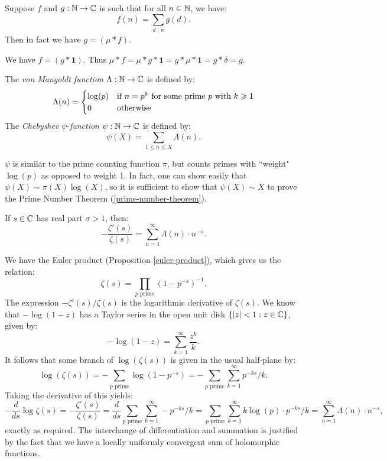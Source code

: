 \documentclass{article}
\begin{document}
\begin{theorem}
    Suppose $f$ and $g : \mathbb{N} \to \mathbb{C}$ is such that for all $n \in \mathbb{N}$, we have:
    \[
	f(n) = \sum_{d \mid n} g(d).
	\]
	Then in fact we have $g = (\mu * f)$.
\end{theorem}

\begin{prf}
    We have $f = (g * \mathbf{1})$. Thus $\mu * f = \mu * g * \mathbf{1} = g * \mu * \mathbf{1} = g * \delta = g$.
\end{prf}

\begin{definition}
    The \textit{von Mangoldt function} $\Lambda: \mathbb{N} \to \mathbb{C}$ is defined by:
    \[
	\Lambda(n) = \begin{cases}
		\log(p) & \text{if $n = p^k$ for some prime $p$ with $k \geqslant 1$} \\
		0 & \!\mathrel{\, \text{otherwise}}
	\end{cases}
	\]
	The \textit{Chebyshev} $\psi$-\textit{function} $\psi : \mathbb{N} \to \mathbb{C}$ is defined by:
	\[
	\psi(X) = \sum_{1 \leq n \leq X} \Lambda(n).
	\]
\end{definition}

\begin{note}
	$\psi$ is similar to the prime counting function $\pi$, but counts primes with ``weight" $\log(p)$ as opposed to weight 1. In fact, one can show easily that $\psi(X) \sim \pi(X) \log(X)$, so it is sufficient to show that $\psi(X) \sim X$ to prove the Prime Number Theorem (\ref{prime-number-theorem}).
\end{note}

\begin{theorem}
    If $s \in \mathbb{C}$ has real part $\sigma > 1$, then:
    \[
	- \frac{\zeta'(s)}{\zeta(s)} = \sum_{n=1}^\infty \Lambda(n) \cdot n^{-s}.
	\]
\end{theorem}

\begin{prf}
    We have the Euler product (Proposition \ref{euler-product}), which gives us the relation:
    \[
 	\zeta(s) = \prod_{p \text{ prime}} \left( 1 - p^{-s} \right)^{-1}.
	\]
	The expression $-\zeta'(s)/\zeta(s)$ is the logarithmic derivative of $\zeta(s)$. We know that $- \log(1-z)$ has a Taylor series in the open unit disk $\left\lbrace \left\lvert z \right\rvert < 1 : z \in \mathbb{C} \right\rbrace$, given by:
	\[
	- \log(1-z) = \sum_{k=1}^\infty \frac{z^k}{k}.
	\]
	It follows that some branch of $\log(\zeta(s))$ is given in the usual half-plane by:
	\[
	\log(\zeta(s)) = - \sum_{p \text{ prime}} \log(1-p^{-s}) = 
	- \sum_{p \text{ prime}} \sum_{k = 1}^\infty p^{-ks}/k.
	\]
	Taking the derivative of this yields:
	\[
	-\frac{d}{ds} \log \zeta(s) = -\frac{\zeta'(s)}{\zeta(s)} =
	\frac{d}{ds} \sum_{p \text{ prime}} \sum_{k = 1}^\infty -p^{-ks}/k
	= \sum_{p \text{ prime}} \sum_{k = 1}^\infty k \log(p) \cdot p^{-ks}/k
	= \sum_{n = 1}^\infty \Lambda(n) \cdot n^{-s},
	\]
	exactly as required. The interchange of differentiation and summation is justified by the fact that we have a locally uniformly convergent sum of holomorphic functions.
\end{prf}
\end{document}

